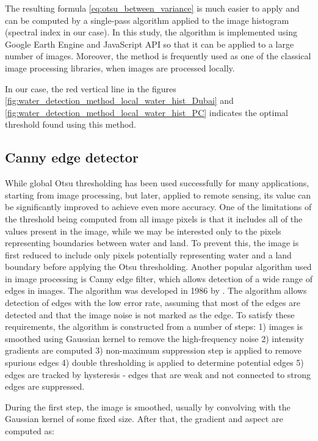 The resulting formula \ref{eq:otsu_between_variance} is much easier to apply and can be computed by a single-pass algorithm applied to the image histogram (spectral index in our case). In this study, the algorithm is implemented using Google Earth Engine and JavaScript API so that it can be applied to a large number of images. Moreover, the method is frequently used as one of the classical image processing libraries, when images are processed locally.

In our case, the red vertical line in the figures \ref{fig:water_detection_method_local_water_hist_Dubai} and \ref{fig:water_detection_method_local_water_hist_PC} indicates the optimal threshold found using this method.

\subsection{Canny edge detector}

While global Otsu thresholding has been used successfully for many applications, starting from image processing, but later, applied to remote sensing, its value can be significantly improved to achieve even more accuracy. One of the limitations of the threshold being computed from all image pixels is that it includes all of the values present in the image, while we may be interested only to the pixels representing boundaries between water and land. To prevent this, the image is first reduced to include only pixels potentially representing water and a land boundary before applying the Otsu thresholding. Another popular algorithm used in image processing is Canny edge filter, which allows detection of a wide range of edges in images. The algorithm was developed in 1986 by \citep{canny1986computational}. The algorithm allows detection of edges with the low error rate, assuming that most of the edges are detected and that the image noise is not marked as the edge. To satisfy these requirements, the algorithm is constructed from a number of steps: 1) images is smoothed using Gaussian kernel to remove the high-frequency noise 2) intensity gradients are computed 3) non-maximum suppression step is applied to remove spurious edges 4) double thresholding is applied to determine potential edges 5) edges are tracked by hysteresis - edges that are weak and not connected to strong edges are suppressed.

During the first step, the image is smoothed, usually by convolving with the Gaussian kernel of some fixed size. After that, the gradient and aspect are computed as:

